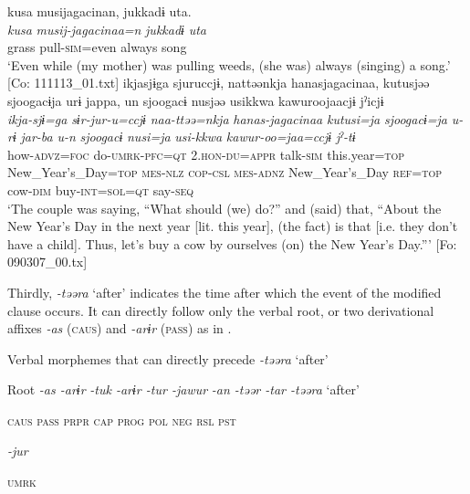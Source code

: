 \ea
{\TM}
\glll  kusa  musijagacinan,  jukkadɨ  uta.\\
\textit{kusa}  \textit{musij-jagacinaa=n}  \textit{jukkadɨ}  \textit{uta}\\
grass  pull-\textsc{sim}=even  always  song\\
\glt ‘Even while (my mother) was pulling weeds, (she was) always (singing) a song.’ [Co: 111113\_01.txt]
\ex
{\TM}
\glll  ikjasjɨga  sjuruccjɨ,  nattəənkja  hanasjagacinaa,      kutusjəə  sjoogacɨja  urɨ  jappa,  un      sjoogacɨ  nusjəə  usikkwa  kawuroojaacjɨ  jˀicjɨ\\
\textit{ikja-sjɨ=ga}  \textit{sɨr-jur-u=ccjɨ}  \textit{naa-ttəə=nkja}  \textit{hanas-jagacinaa} \textit{kutusi=ja}  \textit{sjoogacɨ=ja}  \textit{u-rɨ}  \textit{jar-ba}  \textit{u-n}     \textit{sjoogacɨ}  \textit{nusi=ja}  \textit{usi-kkwa}  \textit{kawur-oo=jaa=ccjɨ}  \textit{jˀ-tɨ}\\
how-\textsc{advz}=\textsc{foc}  do-\textsc{umrk}-\textsc{pfc}=\textsc{qt}  2.\textsc{hon}-\textsc{du}=\textsc{appr}  talk-\textsc{sim}    this.year=\textsc{top}  New\_Year’s\_Day=\textsc{top}  \textsc{mes}-\textsc{nlz}  \textsc{cop}-\textsc{csl}  \textsc{mes}-\textsc{adnz}  New\_Year’s\_Day  \textsc{ref}=\textsc{top}  cow-\textsc{dim}  buy-\textsc{int}=\textsc{sol}=\textsc{qt}  say-\textsc{seq}\\
\glt ‘The couple was saying, “What should (we) do?” and (said) that, “About the New Year’s Day in the next year [lit. this year], (the fact) is that [i.e. they don’t have a child]. Thus, let’s buy a cow by ourselves (on) the New Year’s Day.”’ [Fo: 090307\_00.tx]

  Thirdly, \textit{-təəra} ‘after’ indicates the time after which the event of the modified clause occurs. It can directly follow only the verbal root, or two derivational affixes \textit{-as} (\textsc{caus}) and \textit{-arɨr} (\textsc{pass}) as in .

\ea\label{ex:8-99}
  Verbal morphemes that can directly precede \textit{-təəra} ‘after’

  Root  \textit{-as  -arɨr} %
\textit{-tuk  -arɨr  -tur  -jawur} %
\textit{-an  -təər  -tar  -təəra} ‘after’

    \textsc{caus}  \textsc{pass}  \textsc{prpr}  \textsc{cap}  \textsc{prog}  \textsc{pol}  \textsc{neg}  \textsc{rsl}  \textsc{pst}

          \textit{-jur}

          \textsc{umrk}
\z

